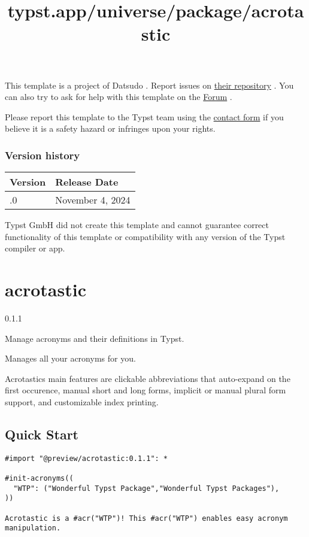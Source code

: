 This template is a project of Datsudo . Report issues on
\href{https://gitlab.com/datsudo/uo-pup-thesis-manuscript}{their
repository} . You can also try to ask for help with this template on the
\href{https://forum.typst.app}{Forum} .

Please report this template to the Typst team using the
\href{https://typst.app/contact}{contact form} if you believe it is a
safety hazard or infringes upon your rights.

\label{versions}
\subsubsection{Version history}\label{version-history}

\begin{longtable}[]{@{}ll@{}}
\toprule\noalign{}
Version & Release Date \\
\midrule\noalign{}
\endhead
\bottomrule\noalign{}
\endlastfoot
0.1.0 & November 4, 2024 \\
\end{longtable}

Typst GmbH did not create this template and cannot guarantee correct
functionality of this template or compatibility with any version of the
Typst compiler or app.


\title{typst.app/universe/package/acrotastic}

\label{banner}
\section{acrotastic}\label{acrotastic}

{ 0.1.1 }

Manage acronyms and their definitions in Typst.

\label{readme}
Manages all your acronyms for you.

Acrotastics main features are clickable abbreviations that auto-expand
on the first occurence, manual short and long forms, implicit or manual
plural form support, and customizable index printing.

\subsection{Quick Start}\label{quick-start}

\begin{verbatim}
#import "@preview/acrotastic:0.1.1": *

#init-acronyms((
  "WTP": ("Wonderful Typst Package","Wonderful Typst Packages"),
))

Acrotastic is a #acr("WTP")! This #acr("WTP") enables easy acronym manipulation.
\end{verbatim}


